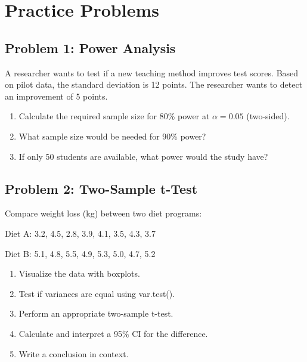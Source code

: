 \documentclass[11pt]{article}
\begin{document}
\section{Practice Problems}

\subsection{Problem 1: Power Analysis}

A researcher wants to test if a new teaching method improves test scores. Based on pilot data, the standard deviation is 12 points. The researcher wants to detect an improvement of 5 points.

\begin{enumerate}[label=\alph*)]
\item Calculate the required sample size for 80\% power at $\alpha = 0.05$ (two-sided).
\item What sample size would be needed for 90\% power?
\item If only 50 students are available, what power would the study have?
\end{enumerate}

\vspace{2cm}

\subsection{Problem 2: Two-Sample t-Test}

Compare weight loss (kg) between two diet programs:

Diet A: 3.2, 4.5, 2.8, 3.9, 4.1, 3.5, 4.3, 3.7

Diet B: 5.1, 4.8, 5.5, 4.9, 5.3, 5.0, 4.7, 5.2

\begin{enumerate}[label=\alph*)]
\item Visualize the data with boxplots.
\item Test if variances are equal using var.test().
\item Perform an appropriate two-sample t-test.
\item Calculate and interpret a 95\% CI for the difference.
\item Write a conclusion in context.
\end{enumerate}

\vspace{2cm}
\end{document}

